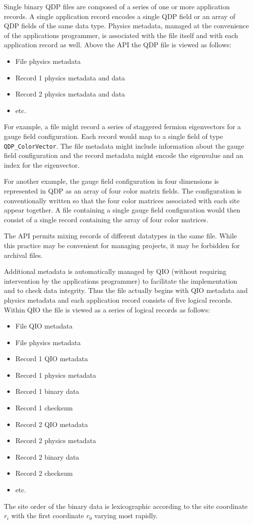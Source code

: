 \documentclass{article}
\begin{document}
Single binary QDP files are composed of a series of one or more
application records.  A single application record encodes a single QDP
field or an array of QDP fields of the same data type.  Physics
metadata, managed at the convenience of the applications programmer,
is associated with the file itself and with each application record as
well. Above the API the QDP file is viewed as follows:
%
\begin{itemize}
  \item File physics metadata
  \item Record 1 physics metadata and data
  \item Record 2 physics metadata and data
  \item etc.
\end{itemize}
%
For example, a file might record a series of staggered fermion
eigenvectors for a gauge field configuration.  Each record would map
to a single field of type \verb|QDP_ColorVector|.  The file metadata
might include information about the gauge field configuration and the
record metadata might encode the eigenvalue and an index for the
eigenvector.

For another example, the gauge field configuration in four dimensions
is represented in QDP as an array of four color matrix fields.  The
configuration is conventionally written so that the four color matrices
associated with each site appear together.  A file containing a single
gauge field configuration would then consist of a single record
containing the array of four color matrices.

The API permits mixing records of different datatypes in the same
file.  While this practice may be convenient for managing projects, it
may be forbidden for archival files.

Additional metadata is automatically managed by QIO (without requiring
intervention by the applications programmer) to facilitate the
implementation and to check data integrity.  Thus the file actually
begins with QIO metadata and physics metadata and each application
record consists of five logical records.  Within QIO the file is
viewed as a series of logical records as follows:
%
\begin{itemize}
  \item File QIO metadata
  \item File physics metadata
  \item Record 1 QIO metadata
  \item Record 1 physics metadata
  \item Record 1 binary data
  \item Record 1 checksum
  \item Record 2 QIO metadata
  \item Record 2 physics metadata
  \item Record 2 binary data
  \item Record 2 checksum
  \item etc.
\end{itemize}
%
The site order of the binary data is lexicographic according to the
site coordinate $r_i$ with the first coordinate $r_0$ varying most
rapidly.
\end{document}
